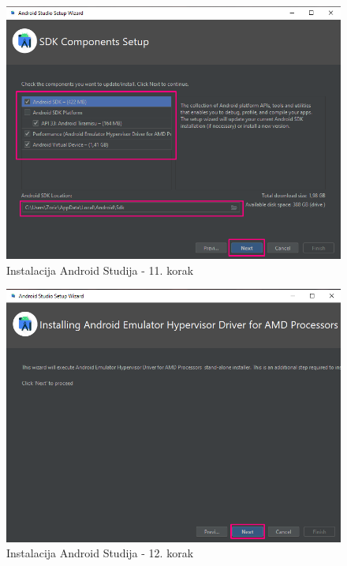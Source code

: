 \documentclass[11pt,a4paper,twoside]{article}
\begin{document}
\begin{figure}[!h]
	\centering
	\includegraphics[width=\textwidth]{install_11.png}
	\caption{Instalacija Android Studija - 11. korak}
	\label{fig:install_11}	
\end{figure}

\begin{figure}[!h]
	\centering
	\includegraphics[width=\textwidth]{install_12.png}
	\caption{Instalacija Android Studija - 12. korak}
	\label{fig:install_12}	
\end{figure}
\end{document}
